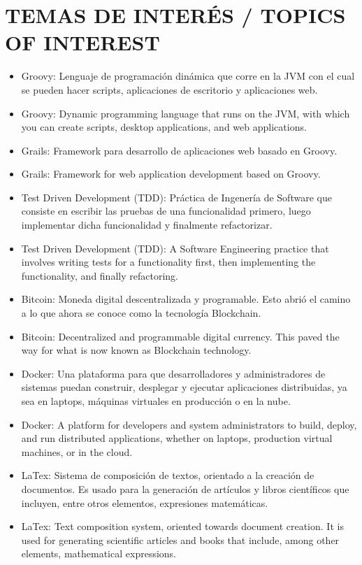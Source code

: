 \documentclass[paper=a4,fontsize=11pt]{scrartcl} %
\newcommand{\NewPart}[1]{\section*{\uppercase{#1}}}
\begin{document}
\NewPart{Temas de Interés / Topics of Interest}{}{}{
\begin{itemize}
\item{Groovy: Lenguaje de programación dinámica que corre en la JVM con el cual se pueden hacer scripts, aplicaciones de escritorio y aplicaciones web.}
\item{Groovy: Dynamic programming language that runs on the JVM, with which you can create scripts, desktop applications, and web applications.}
\item{Grails: Framework para desarrollo de aplicaciones web basado en Groovy.}
\item{Grails: Framework for web application development based on Groovy.}
\item{Test Driven Development (TDD): Práctica de Ingenería de Software que consiste en escribir las pruebas de una funcionalidad primero, luego implementar dicha funcionalidad y finalmente refactorizar.}
\item{Test Driven Development (TDD): A Software Engineering practice that involves writing tests for a functionality first, then implementing the functionality, and finally refactoring.}
\item{Bitcoin: Moneda digital descentralizada y programable. Esto abrió el camino a lo que ahora se conoce como la tecnología Blockchain.}
\item{Bitcoin: Decentralized and programmable digital currency. This paved the way for what is now known as Blockchain technology.}
\item{Docker: Una plataforma para que desarrolladores y administradores de sistemas puedan construir, desplegar y ejecutar aplicaciones distribuidas, ya sea en laptops, máquinas virtuales en producción o en la nube.}
\item{Docker: A platform for developers and system administrators to build, deploy, and run distributed applications, whether on laptops, production virtual machines, or in the cloud.}
\item{LaTex: Sistema de composición de textos, orientado a la creación de documentos. Es usado para la generación de artículos y libros científicos que incluyen, entre otros elementos, expresiones matemáticas.}
\item{LaTex: Text composition system, oriented towards document creation. It is used for generating scientific articles and books that include, among other elements, mathematical expressions.}
\end{itemize}
}
\end{document}
